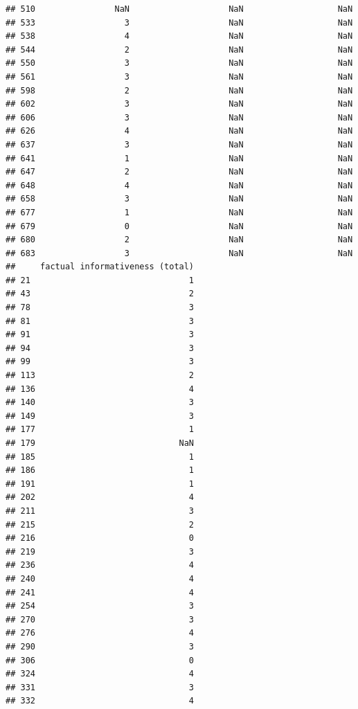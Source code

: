 \documentclass[
]{article}
\begin{document}
\begin{verbatim}
## 510                NaN                    NaN                   NaN
## 533                  3                    NaN                   NaN
## 538                  4                    NaN                   NaN
## 544                  2                    NaN                   NaN
## 550                  3                    NaN                   NaN
## 561                  3                    NaN                   NaN
## 598                  2                    NaN                   NaN
## 602                  3                    NaN                   NaN
## 606                  3                    NaN                   NaN
## 626                  4                    NaN                   NaN
## 637                  3                    NaN                   NaN
## 641                  1                    NaN                   NaN
## 647                  2                    NaN                   NaN
## 648                  4                    NaN                   NaN
## 658                  3                    NaN                   NaN
## 677                  1                    NaN                   NaN
## 679                  0                    NaN                   NaN
## 680                  2                    NaN                   NaN
## 683                  3                    NaN                   NaN
##     factual informativeness (total)
## 21                                1
## 43                                2
## 78                                3
## 81                                3
## 91                                3
## 94                                3
## 99                                3
## 113                               2
## 136                               4
## 140                               3
## 149                               3
## 177                               1
## 179                             NaN
## 185                               1
## 186                               1
## 191                               1
## 202                               4
## 211                               3
## 215                               2
## 216                               0
## 219                               3
## 236                               4
## 240                               4
## 241                               4
## 254                               3
## 270                               3
## 276                               4
## 290                               3
## 306                               0
## 324                               4
## 331                               3
## 332                               4

\end{verbatim}
\end{document}
